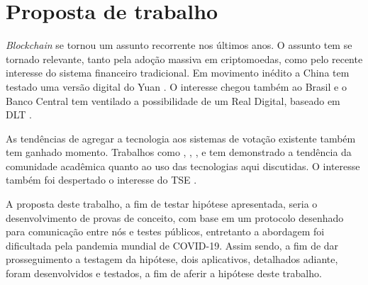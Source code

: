 \chapter{Proposta de trabalho}

\textit{Blockchain} se tornou um assunto recorrente nos últimos anos. O assunto tem se tornado relevante, tanto pela adoção massiva em criptomoedas, como pelo recente interesse do sistema financeiro tradicional. Em movimento inédito a China tem testado uma versão digital do Yuan \cite{Carvalho2020}. O interesse chegou também ao Brasil e o Banco Central tem ventilado a possibilidade de um Real Digital, baseado em DLT \cite{Tecmundo2021}.

As tendências de agregar a tecnologia aos sistemas de votação existente também tem ganhado momento. Trabalhos como , , ,  e  tem demonstrado a tendência da comunidade acadêmica quanto ao uso das tecnologias aqui discutidas. O interesse também foi despertado o interesse do TSE \cite{GUSSON}. 

A proposta deste trabalho, a fim de testar hipótese apresentada, seria o desenvolvimento de provas de conceito, com base em um protocolo desenhado para comunicação entre nós e testes públicos, entretanto a abordagem foi dificultada pela pandemia mundial de COVID-19. Assim sendo, a fim de dar prosseguimento a testagem da hipótese, dois aplicativos, detalhados adiante, foram desenvolvidos e testados, a fim de aferir a hipótese deste trabalho. 